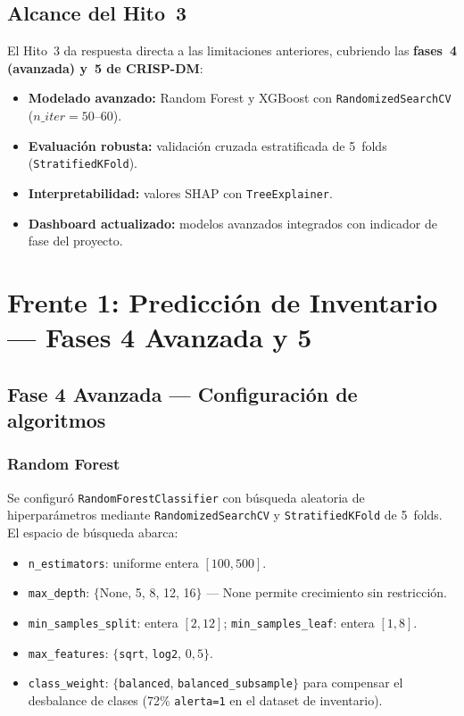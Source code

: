 \documentclass[12pt, a4paper]{article}
\begin{document}
\subsection{Alcance del Hito~3}

El Hito~3 da respuesta directa a las limitaciones anteriores, cubriendo las \textbf{fases~4 (avanzada) y~5 de CRISP-DM}:

\begin{itemize}[leftmargin=1.5em, itemsep=3pt]
  \item \textbf{Modelado avanzado:} Random Forest y XGBoost con \texttt{RandomizedSearchCV} ($n\_iter = 50$--$60$).
  \item \textbf{Evaluaci\'on robusta:} validaci\'on cruzada estratificada de 5~folds (\texttt{StratifiedKFold}).
  \item \textbf{Interpretabilidad:} valores SHAP con \texttt{TreeExplainer}.
  \item \textbf{Dashboard actualizado:} modelos avanzados integrados con indicador de fase del proyecto.
\end{itemize}

\newpage

\section{Frente 1: Predicci\'on de Inventario --- Fases 4 Avanzada y 5}

\subsection{Fase 4 Avanzada --- Configuraci\'on de algoritmos}

\subsubsection{Random Forest}

Se configur\'o \texttt{RandomForestClassifier} con b\'usqueda aleatoria de hiperpar\'ametros mediante \texttt{RandomizedSearchCV} y \texttt{StratifiedKFold} de 5~folds. El espacio de b\'usqueda abarca:

\begin{itemize}[leftmargin=1.5em, itemsep=2pt]
  \item \texttt{n\_estimators}: uniforme entera $[100, 500]$.
  \item \texttt{max\_depth}: $\{$None, 5, 8, 12, 16$\}$ --- None permite crecimiento sin restricci\'on.
  \item \texttt{min\_samples\_split}: entera $[2, 12]$; \quad \texttt{min\_samples\_leaf}: entera $[1, 8]$.
  \item \texttt{max\_features}: $\{$\texttt{sqrt}, \texttt{log2}, $0{,}5\}$.
  \item \texttt{class\_weight}: $\{$\texttt{balanced}, \texttt{balanced\_subsample}$\}$ para compensar el desbalance de clases (72\% \texttt{alerta=1} en el dataset de inventario).
\end{itemize}
\end{document}
